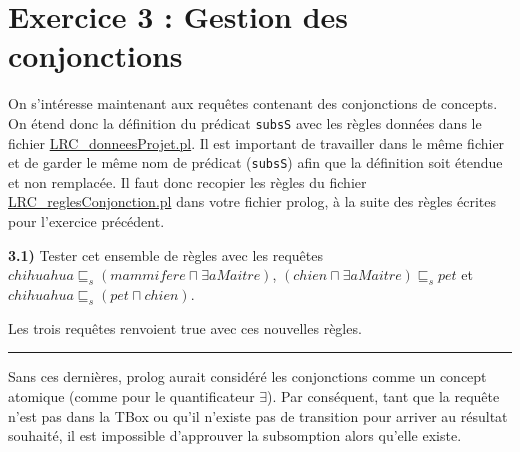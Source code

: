 \documentclass[a4paper,12pt]{report}
\begin{document}

\newpage
\section*{Exercice 3 : Gestion des conjonctions}

On s'intéresse maintenant aux requêtes contenant des conjonctions de concepts. On étend donc la définition du prédicat \texttt{subsS} avec les règles données dans le 
    fichier \href{./src/LRC\_donneesProjet.pl}{LRC\_donneesProjet.pl}. Il est important de travailler dans le même fichier et de garder le même nom de prédicat (\texttt{subsS})
    afin que la définition soit étendue et non remplacée. Il faut donc recopier les règles du fichier \href{./src/LRC\_reglesConjonction.pl}{LRC\_reglesConjonction.pl}
    dans votre fichier prolog, à la suite des règles écrites pour l'exercice précédent.




\vspace{0.5cm}

{}

\textbf{3.1)} Tester cet ensemble de règles avec les requêtes \(chihuahua \sqsubseteq_s (mammifere \sqcap \exists aMaitre)\), \((chien \sqcap \exists aMaitre) \sqsubseteq_s pet\)
    et \(chihuahua \sqsubseteq_s (pet \sqcap chien)\).



\begin{tcolorbox}[colback=gray!10, colframe=blue!30, coltitle=black, title=Réponse à la question 3.1 - 1/1]

    Les trois requêtes renvoient true avec ces nouvelles règles. 
    
    \vspace{0.5cm}
    \hrule
    \vspace{0.5cm}

    Sans ces dernières, prolog aurait considéré les conjonctions comme un concept atomique (comme pour le quantificateur \(\exists\)). Par conséquent, tant que la 
        requête n'est pas dans la TBox ou qu'il n'existe pas de transition pour arriver au résultat souhaité, il est impossible d'approuver la subsomption alors
        qu'elle existe.

\end{tcolorbox}
\end{document}
